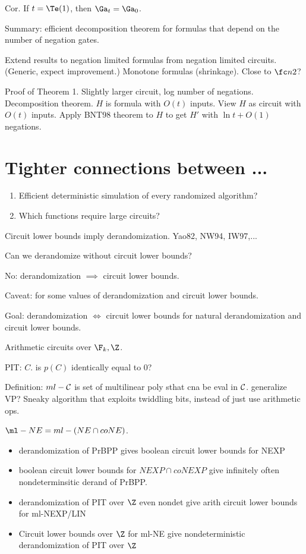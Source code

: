 Cor. If $t=\Te(1)$, then $\Ga_t=\Ga_0$.

Summary: efficient decomposition theorem for formulas that depend on the number of negation gates.

Extend results to negation limited formulas from negation limited circuits. (Generic, expect improvement.) Monotone formulas (shrinkage). Close to $\fc n2$?

Proof of Theorem 1. Slightly larger circuit, log number of negations. Decomposition theorem. $H$ is formula with $O(t)$ inputs. View $H$ as circuit with $O(t)$ inputs. Apply BNT98 theorem to $H$ to get $H'$ with $\ln t +O(1)$ negations.

\section{Tighter connections between ...}

\begin{enumerate}
\item
Efficient deterministic simulation of every randomized algorithm?
\item
Which functions require large circuits?
\end{enumerate}
Circuit lower bounds imply derandomization. Yao82, NW94, IW97,...

Can we derandomize without circuit lower bounds?

No: derandomization $\implies$ circuit lower bounds. 

Caveat: for some values of derandomization and circuit lower bounds.

Goal: derandomization $\iff$ circuit lower bounds for natural derandomization and circuit lower bounds.

Arithmetic circuits over $\F_k,\Z$.

PIT: $C$. is $p(C)$ identically equal to 0?

Definition: $ml-\cal C$ is set of multilinear poly sthat cna be eval in $\cal C$. generalize VP? Sneaky algorithm that exploits twiddling bits, instead of just use arithmetic ops.

$\ml-NE=ml-(NE\cap coNE)$.

\begin{itemize}
\item
derandomization of PrBPP gives boolean circuit lower bounds for NEXP
\item
boolean circuit lower bounds for $NEXP\cap coNEXP$ give infinitely often nondeterminsitic derand of PrBPP.
\item
derandomization of PIT over $\Z$ even nondet give arith circuit lower bounds for ml-NEXP/LIN
\item
Circuit lower bounds over $\Z$ for ml-NE give nondeterministic derandomization of PIT over $\Z$
\end{itemize}

